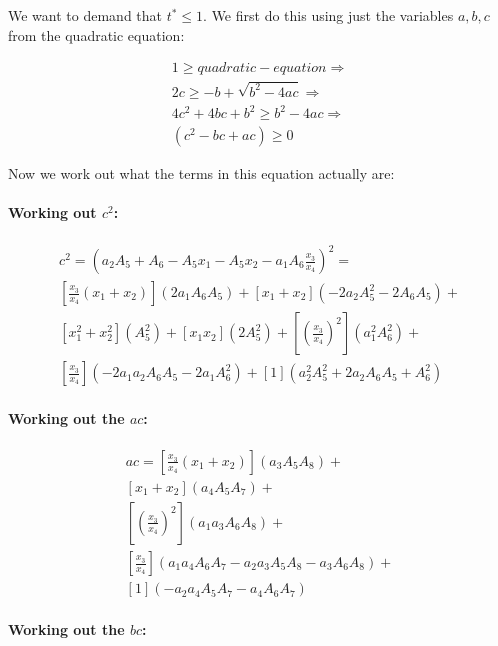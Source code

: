 \documentclass[UKenglish]{lipics-v2019}
\begin{document}
We want to demand that $t^* \le 1$. We first do this using just the variables $a,b,c$ from the quadratic equation:

\begin{align*}
     1 \ge quadratic-equation \Rightarrow \\
    2c \ge -b + \sqrt{b^2 - 4 ac} \Rightarrow \\
    4c^2 + 4bc + b^2 \ge b^2 - 4 ac \Rightarrow \\
    (c^2 - bc + ac) \ge 0 
\end{align*}


Now we work out what the terms in this equation actually are: 

\paragraph*{Working out $c^2$:}

\begin{align*}
    c^2 = \left(a_2 A_5 + A_6- A_5x_1  - A_5x_2  - a_1A_6 \frac{x_3}{x_4} \right)^2 = \\
    \left[\frac{x_3}{x_4}(x_1 + x_2)\right]( 2 a_1 A_6 A_5) + 
    [x_1 + x_2](- 2 a_2 A_5^2 - 2 A_6 A_5) +\\
    [x_1^2 + x_2^2](A_5^2) +
    [x_1x_2](2A_5^2) +
   \left [\left( \frac{x_3}{x_4} \right)^2 \right](a_1^2 A_6^2) + \\
    \left[\frac{x_3}{x_4}\right]( - 2 a_1 a_2 A_6 A_5  - 2 a_1 A_6^2) +
    [1](a_2^2 A_5^2+ 2 a_2 A_6 A_5+ A_6^2)
\end{align*}


\paragraph*{Working out the $ac$:}

\begin{align*}
    ac = 
     \left[\frac{x_3}{x_4}(x_1 + x_2)\right](a_3 A_5 A_8) + \\
     [x_1 + x_2](a_4 A_5 A_7) +\\
    \left [\left( \frac{x_3}{x_4} \right)^2 \right](a_1 a_3 A_6 A_8) +\\
      \left[\frac{x_3}{x_4}\right](a_1 a_4 A_6 A_7- a_2 a_3 A_5 A_8- a_3 A_6 A_8) +\\
     [1](- a_2 a_4 A_5 A_7 - a_4 A_6 A_7)
\end{align*}

\paragraph{Working out the $bc$:}
\end{document}
